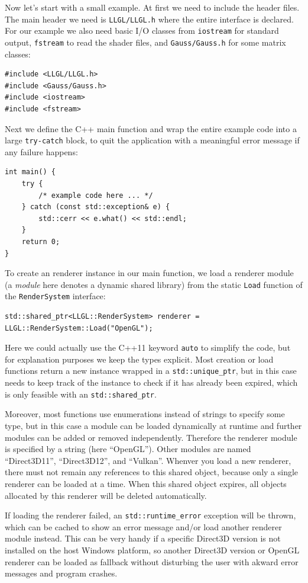\documentclass{article}
\begin{document}
Now let's start with a small example. At first we need to include the header files.
The main header we need is \texttt{LLGL/LLGL.h} where the entire \LLGL interface is declared.
For our example we also need basic I/O classes from \texttt{iostream} for standard output, \texttt{fstream}
to read the shader files, and \texttt{Gauss/Gauss.h} for some matrix classes:
\begin{lstlisting}
#include <LLGL/LLGL.h>
#include <Gauss/Gauss.h>
#include <iostream>
#include <fstream>
\end{lstlisting}
Next we define the C++ main function and wrap the entire example code into a large \texttt{try-catch} block,
to quit the application with a meaningful error message if any failure happens:
\begin{lstlisting}
int main() {
    try {
        /* example code here ... */
    } catch (const std::exception& e) {
        std::cerr << e.what() << std::endl;
    }
    return 0;
}
\end{lstlisting}
To create an \LLGL renderer instance in our main function, we load a renderer module
(a \textit{module} here denotes a dynamic shared library)
from the static \texttt{Load} function of the \texttt{RenderSystem} interface:
\begin{lstlisting}
std::shared_ptr<LLGL::RenderSystem> renderer = LLGL::RenderSystem::Load("OpenGL");
\end{lstlisting}
Here we could actually use the C++11 keyword \texttt{auto} to simplify the code,
but for explanation purposes we keep the types explicit.
Most creation or load functions return a new instance wrapped in a \texttt{std::unique\_ptr},
but in this case \LLGL needs to keep track of the instance to check if it has already been expired,
which is only feasible with an \texttt{std::shared\_ptr}.

Moreover, most functions use enumerations instead of strings to specify some type, but in this case
a module can be loaded dynamically at runtime and further modules can be added or removed independently.
Therefore the renderer module is specified by a string (here ``OpenGL''). Other modules are
named ``Direct3D11'', ``Direct3D12'', and ``Vulkan''.
Whenver you load a new renderer, there must not remain any references to this shared object,
because only a single renderer can be loaded at a time.
When this shared object expires, all objects allocated by this renderer will be deleted automatically.

If loading the renderer failed, an \texttt{std::runtime\_error} exception will be thrown,
which can be cached to show an error message and/or load another renderer module instead.
This can be very handy if a specific Direct3D version is not installed on the host Windows platform,
so another Direct3D version or OpenGL renderer can be loaded as fallback
without disturbing the user with akward error messages and program crashes.
\end{document}
